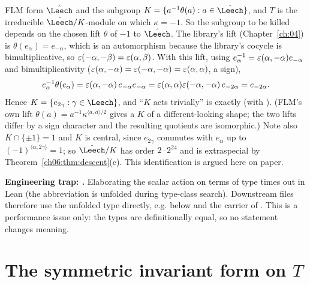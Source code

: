 \begin{remark}[Why $K=\{e_{2\alpha}\}$ is the right normalisation]\label{ch06:rem:K}
FLM form $\hat\Leech$ and the subgroup $K=\{a^{-1}\theta(a): a\in\hat\Leech\}$, and $T$ is the
irreducible $\hat\Leech/K$-module on which $\kappa=-1$.  So the subgroup to be killed depends on
the chosen lift $\theta$ of $-1$ to $\hat\Leech$.  The library's lift (Chapter~\ref{ch:04}) is
$\theta(e_\alpha)=e_{-\alpha}$, which is an automorphism because the library's cocycle is
bimultiplicative, so $\varepsilon(-\alpha,-\beta)=\varepsilon(\alpha,\beta)$.  With this lift,
using $e_\alpha^{-1}=\varepsilon(\alpha,-\alpha)e_{-\alpha}$ and bimultiplicativity
($\varepsilon(\alpha,-\alpha)=\varepsilon(-\alpha,-\alpha)=\varepsilon(\alpha,\alpha)$, a sign),
\begin{equation*}
  e_\alpha^{-1}\theta(e_\alpha)=\varepsilon(\alpha,-\alpha)\,e_{-\alpha}e_{-\alpha}
  =\varepsilon(\alpha,\alpha)\varepsilon(-\alpha,-\alpha)\,e_{-2\alpha}=e_{-2\alpha}.
\end{equation*}
Hence $K=\{e_{2\gamma}:\gamma\in\Leech\}$, and ``$K$ acts trivially'' is exactly
 (with ).  (FLM's own lift
$\theta(a)=a^{-1}\kappa^{\langle\bar a,\bar a\rangle/2}$ gives a $K$ of a different-looking shape;
the two lifts differ by a sign character and the resulting quotients are isomorphic.)  Note
also $K\cap\{\pm1\}=1$ and $K$ is central, since $e_{2\gamma}$ commutes with $e_\alpha$ up to
$(-1)^{\langle\alpha,2\gamma\rangle}=1$; so $\hat\Leech/K$ has order $2\cdot2^{24}$ and is
extraspecial by Theorem~\ref{ch06:thm:descent}(c).  This identification is argued here on paper.
\end{remark}

\begin{warning}
\textbf{Engineering trap: .}  Elaborating the scalar action on terms of type
 times out in Lean (the abbreviation is unfolded during type-class
search).  Downstream files therefore use the unfolded type  directly, e.g.
 below and the carrier of .  This is a performance
issue only: the types are definitionally equal, so no statement changes meaning.
\end{warning}

\section{The symmetric invariant form on \texorpdfstring{$T$}{T}}\label{ch06:sec:form}

